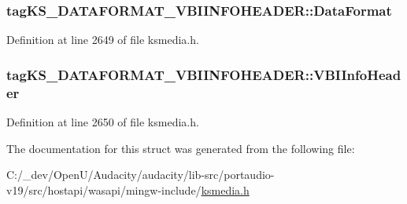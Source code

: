 \subsubsection[{\texorpdfstring{Data\+Format}{DataFormat}}]{ tag\+K\+S\+\_\+\+D\+A\+T\+A\+F\+O\+R\+M\+A\+T\+\_\+\+V\+B\+I\+I\+N\+F\+O\+H\+E\+A\+D\+E\+R\+::\+Data\+Format}\hypertarget{structtag_k_s___d_a_t_a_f_o_r_m_a_t___v_b_i_i_n_f_o_h_e_a_d_e_r_aea0c680dd4bc78a8ebeac530863fd2a7}{}\label{structtag_k_s___d_a_t_a_f_o_r_m_a_t___v_b_i_i_n_f_o_h_e_a_d_e_r_aea0c680dd4bc78a8ebeac530863fd2a7}


Definition at line 2649 of file ksmedia.\+h.

\subsubsection[{\texorpdfstring{V\+B\+I\+Info\+Header}{VBIInfoHeader}}]{ tag\+K\+S\+\_\+\+D\+A\+T\+A\+F\+O\+R\+M\+A\+T\+\_\+\+V\+B\+I\+I\+N\+F\+O\+H\+E\+A\+D\+E\+R\+::\+V\+B\+I\+Info\+Header}\hypertarget{structtag_k_s___d_a_t_a_f_o_r_m_a_t___v_b_i_i_n_f_o_h_e_a_d_e_r_a27ce4450a0307d1418dace64d39abbe5}{}\label{structtag_k_s___d_a_t_a_f_o_r_m_a_t___v_b_i_i_n_f_o_h_e_a_d_e_r_a27ce4450a0307d1418dace64d39abbe5}


Definition at line 2650 of file ksmedia.\+h.



The documentation for this struct was generated from the following file\+:\begin{DoxyCompactItemize}
\item 
C\+:/\+\_\+dev/\+Open\+U/\+Audacity/audacity/lib-\/src/portaudio-\/v19/src/hostapi/wasapi/mingw-\/include/\hyperlink{ksmedia_8h}{ksmedia.\+h}\end{DoxyCompactItemize}
